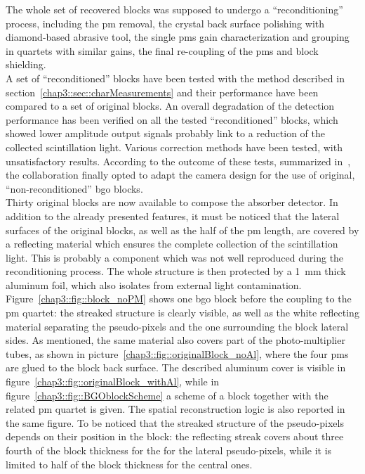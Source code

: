 The whole set of recovered blocks was supposed to undergo a \enquote{reconditioning} process, including the \gls{pm} removal, the crystal back surface polishing with diamond-based abrasive tool, the single \glspl{pm} gain characterization and grouping in quartets with similar gains, the final re-coupling of the \glspl{pm} and block shielding.\\ A set of \enquote{reconditioned} blocks have been tested with the method described in section~\ref{chap3::sec::charMeasurements} and their performance have been compared to a set of original blocks. An overall degradation of the detection performance has been verified on all the tested \enquote{reconditioned} blocks, which showed lower amplitude output signals probably link to a reduction of the collected scintillation light. Various correction methods have been tested, with unsatisfactory results. According to the outcome of these tests, summarized in~\cite{Sandjong2017}, the collaboration finally opted to adapt the camera design for the use of original, \enquote{non-reconditioned} \gls{bgo} blocks.\\    
Thirty original blocks are now available to compose the absorber detector. In addition to the already presented features, it must be noticed that the lateral surfaces of the original blocks, as well as the half of the \gls{pm} length, are covered by a reflecting material which ensures the complete collection of the scintillation light. This is probably a component which was not well reproduced during the reconditioning process. The whole structure is then protected by a 1~mm thick aluminum foil, which also isolates from external light contamination.\\
Figure~\ref{chap3::fig::block_noPM} shows one \gls{bgo} block before the coupling to the \gls{pm} quartet: the streaked structure is clearly visible, as well as the white reflecting material separating the pseudo-pixels and the one surrounding the block lateral sides. As mentioned, the same material also covers part of the photo-multiplier tubes, as shown in picture~\ref{chap3::fig::originalBlock_noAl}, where the four \glspl{pm} are glued to the block back surface. The described aluminum cover is visible in figure~\ref{chap3::fig::originalBlock_withAl}, while in figure~\ref{chap3::fig::BGOblockScheme} a scheme of a block together with the related \gls{pm} quartet is given. The spatial reconstruction logic is also reported in the same figure. To be noticed that the streaked structure of the pseudo-pixels depends on their position in the block: the reflecting streak covers about three fourth of the block thickness for the for the lateral pseudo-pixels, while it is limited to half of the block thickness for the central ones.\\ 

